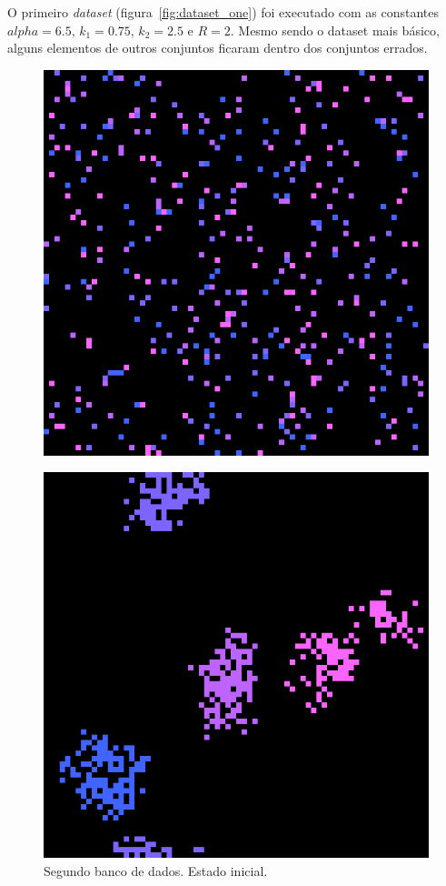 \documentclass[conference]{IEEEtran}
\begin{document}
O primeiro \textit{dataset} (figura~\ref{fig:dataset_one}) foi executado com as constantes $alpha = 6.5$, $k_1 = 0.75$, $k_2=2.5$ e $R=2$. Mesmo sendo o dataset mais básico, alguns elementos de outros conjuntos ficaram dentro dos conjuntos errados.


\begin{figure}[H] 
  \begin{minipage}[b]{0.5\linewidth}
    \label{fig:dataset_two}
    \centering
    \includegraphics[width=.8\linewidth]{resultados/data/dataset_two/2-0.png} 
    \caption{Segundo banco de dados. Estado inicial.} 
    \vspace{4ex}
  \end{minipage}%
  \begin{minipage}[b]{0.5\linewidth}
    \centering
    \includegraphics[width=.8\linewidth]{resultados/data/dataset_two/2-1.png} 

\end{minipage}
\end{figure}
\end{document}
